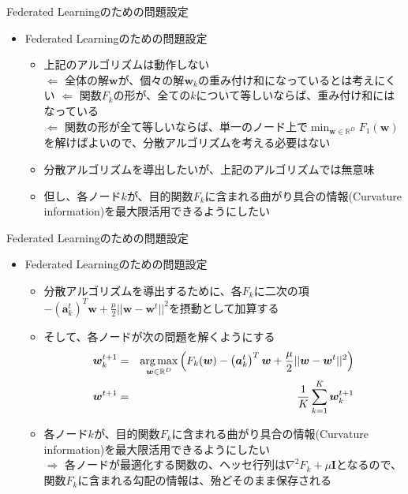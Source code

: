 \documentclass[dvipdfmx,notheorems,t]{beamer}
\begin{document}
\begin{frame}{Federated Learningのための問題設定}

\begin{itemize}
	\item Federated Learningのための問題設定
	\begin{itemize}
		\item 上記のアルゴリズムは\alert{動作しない} \\
		$\Leftarrow$ 全体の解$\bm{w}$が、個々の解$\bm{w}_k$の重み付け和になっているとは考えにくい \newline \newline
		$\Leftarrow$ 関数$F_k$の形が、全ての$k$について等しいならば、重み付け和にはなっている \\
		$\Leftarrow$ 関数の形が全て等しいならば、単一のノード上で$\min_{\bm{w} \in \mathbb{R}^D} F_1(\bm{w})$を解けばよいので、分散アルゴリズムを考える必要はない
		\newline
		
		\item 分散アルゴリズムを導出したいが、上記のアルゴリズムでは無意味
		\item 但し、各ノード$k$が、目的関数$F_k$に含まれる曲がり具合の情報(Curvature information)を最大限活用できるようにしたい
	\end{itemize}
\end{itemize}

\end{frame}

\begin{frame}{Federated Learningのための問題設定}

\begin{itemize}
	\item Federated Learningのための問題設定
	\begin{itemize}
		\item 分散アルゴリズムを導出するために、各$F_k$に二次の項$-\left( \bm{a}_k^t \right)^T \bm{w} + \frac{\mu}{2} || \bm{w} - \bm{w}^t ||^2$を摂動として加算する
		\newline
		
		\item そして、各ノードが次の問題を解くようにする
		\begin{eqnarray}
			\bm{w}_k^{t + 1} &=& \operatorname*{arg\,max}_{\bm{w} \in \mathbb{R}^D} \left( F_k(\bm{w}) - \left( \bm{a}_k^t \right)^T \bm{w} + \frac{\mu}{2} || \bm{w} - \bm{w}^t ||^2 \right) \\
			\bm{w}^{t + 1} &=& \frac{1}{K} \sum_{k = 1}^K \bm{w}_k^{t + 1}
		\end{eqnarray}
		
		\item 各ノード$k$が、目的関数$F_k$に含まれる曲がり具合の情報(Curvature information)を最大限活用できるようにしたい \\
		$\Rightarrow$ 各ノードが最適化する関数の、ヘッセ行列は$\nabla^2 F_k + \mu \bm{I}$となるので、関数$F_k$に含まれる勾配の情報は、殆どそのまま保存される
	\end{itemize}
\end{itemize}

\end{frame}
\end{document}
